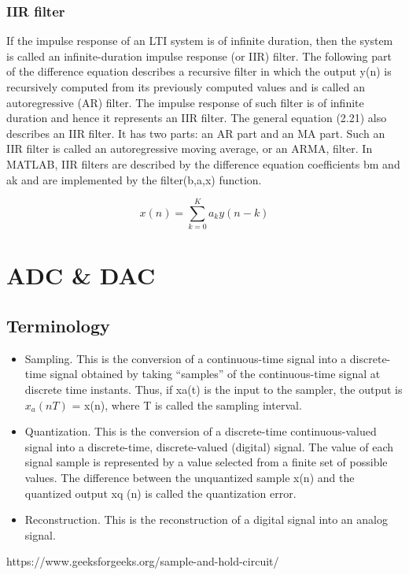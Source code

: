 \documentclass{article}
\begin{document}
\subsubsection{IIR filter}
If the impulse response of an LTI system is of infinite duration, then the system is called an infinite-duration impulse response (or
IIR) filter. The following part of the difference equation describes a recursive filter in which the output y(n) is recursively computed from its previously computed values and is called an autoregressive
(AR) filter. The impulse response of such filter is of infinite duration and
hence it represents an IIR filter. The general equation (2.21) also describes
an IIR filter. It has two parts: an AR part and an MA part. Such an IIR
filter is called an autoregressive moving average, or an ARMA, filter. In
MATLAB, IIR filters are described by the difference equation coefficients
{bm} and {ak} and are implemented by the filter(b,a,x) function.

\begin{equation}
 x(n) = \sum_{k=0}^{K}a_ky(n-k)   
\end{equation}

\newpage
\section{ADC \& DAC}
\subsection{Terminology}
\begin{itemize}
    \item Sampling. This is the conversion of a continuous-time signal into a discrete-time signal obtained by taking “samples” of the continuous-time signal at discrete time instants. Thus, if xa(t) is the input to the sampler, the output is $x_a(nT)$ = x(n), where T is called the sampling interval.
    \item Quantization. This is the conversion of a discrete-time continuous-valued signal into a discrete-time, discrete-valued (digital) signal. The value of each signal sample is represented by a value selected from a finite set of possible values. The difference between the unquantized sample x(n) and the quantized output xq (n) is called the quantization error.
    \item Reconstruction. This is the reconstruction of a digital signal into an analog signal.
\end{itemize}
https://www.geeksforgeeks.org/sample-and-hold-circuit/
\end{document}
